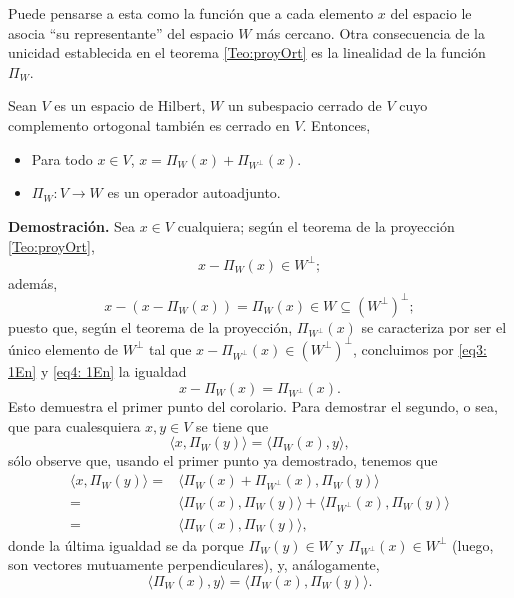 Puede pensarse a esta como la función que a cada elemento
$x$ del espacio le asocia ``su representante'' del espacio $W$
más cercano. Otra consecuencia de la unicidad establecida en el teorema
\ref{Teo:proyOrt} es la linealidad de la función
$\Pi_{W}$. 

\begin{cor}
\label{cor: x como suma de proyecciones}
Sean $V$ es un espacio de Hilbert, $W$ un subespacio cerrado de 
$V$ cuyo complemento ortogonal también es cerrado en $V$.
Entonces,
\begin{itemize}
\item Para todo $x \in V$, $x= \Pi_{W}(x)+ \Pi_{W^{\perp}}(x)$.
\item $\Pi_{W}: V \longrightarrow W$ es un operador autoadjunto.
\end{itemize}
\end{cor}
\noindent
\textbf{Demostración.}
Sea $x \in V$ cualquiera; según el teorema
de la proyección
\ref{Teo:proyOrt}, 
\begin{equation}
\label{eq3: 1En}
x - \Pi_{W}(x) \in W^{\perp};
\end{equation}
además,
\begin{equation}
\label{eq4: 1En}
x-(x-\Pi_{W}(x))= \Pi_{W}(x) \in W \subseteq (W^{\perp})^{\perp};
\end{equation}
puesto que, según el teorema de la proyección, 
$\Pi_{W^{\perp}}(x)$ se caracteriza por ser el 
único elemento de $W^{\perp}$ tal que 
$x-\Pi_{W^{\perp}}(x) \in (W^{\perp})^{\perp}$,
concluimos por \eqref{eq3: 1En} y \eqref{eq4: 1En}
la igualdad
\[
x-\Pi_{W}(x)= \Pi_{W^{\perp}}(x).
\]
Esto demuestra el primer punto del corolario. Para demostrar
el segundo, o sea, que para cualesquiera
$x, y \in V$ se tiene que
\[
\langle x, \Pi_{W}(y) \rangle = 
\langle \Pi_{W}(x), y \rangle,
\]
sólo observe que,
usando el primer punto ya demostrado, tenemos que
\begin{align*}
\langle x, \Pi_{W}(y) \rangle = & 
\langle \Pi_{W}(x) + \Pi_{W^{\perp}}(x), \Pi_{W}(y) \rangle  \\
= & \langle \Pi_{W}(x), \Pi_{W}(y) \rangle  + 
\langle \Pi_{W^{\perp}}(x), \Pi_{W}(y) \rangle  \\
= & \langle \Pi_{W}(x), \Pi_{W}(y) \rangle  ,
\end{align*}
donde la última igualdad se da porque $\Pi_{W}(y) \in W$ y 
$\Pi_{W^{\perp}}(x) \in W^{\perp}$ (luego,
son vectores mutuamente perpendiculares), y, análogamente,
\[
\langle \Pi_{W}(x), y \rangle  =  
\langle \Pi_{W}(x), \Pi_{W}(y)\rangle .
\]
\QEDB
\vspace{0.2cm}

